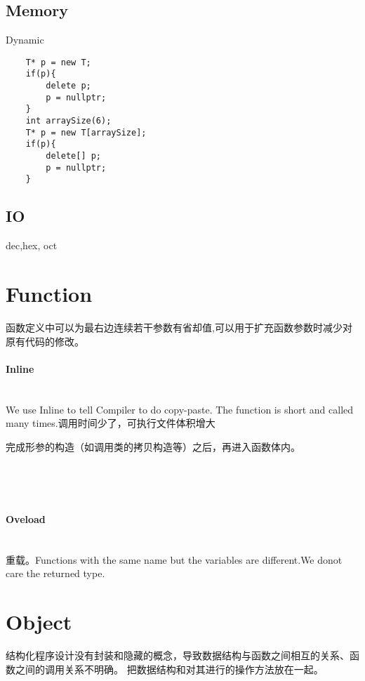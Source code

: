 \documentclass[UTF8]{article}
\begin{document}
\subsection{Memory}
Dynamic
\begin{lstlisting}
    T* p = new T;
    if(p){
        delete p;
        p = nullptr;
    }
    int arraySize(6);
    T* p = new T[arraySize];
    if(p){
        delete[] p;
        p = nullptr;
    }
\end{lstlisting}


\subsection{IO}

dec,hex, oct





\section{Function}
函数定义中可以为最右边连续若干参数有省却值,可以用于扩充函数参数时减少对原有代码的修改。
\paragraph{Inline} \quad\\
We use Inline to tell Compiler to do copy-paste. The function is short and called many times.调用时间少了，可执行文件体积增大

完成形参的构造（如调用类的拷贝构造等）之后，再进入函数体内。
\begin{lstlisting}


    
\end{lstlisting}
\paragraph{Oveload} \quad\\
重载。Functions with the same name but the variables are different.We donot care the returned type.




\section{Object}
结构化程序设计没有封装和隐藏的概念，导致数据结构与函数之间相互的关系、函数之间的调用关系不明确。
把数据结构和对其进行的操作方法放在一起。
\end{document}
